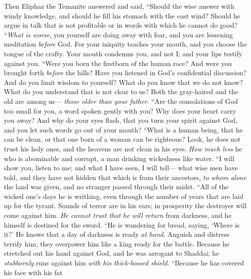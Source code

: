 \begin{biblechapter} %
 Then Eliphaz the Temanite answered and said,
\verse “Should the wise answer with windy knowledge, 
and should he fill his stomach with the east wind?
\verse Should he argue in talk that is not profitable 
or in words with which he cannot do good?
\verse “\textit{What is worse}, you yourself are doing away with fear, 
and you are lessening meditation \textit{before} God.
\verse For your iniquity teaches your mouth, 
and you choose the tongue of the crafty.
\verse Your mouth condemns you, and not I; 
and your lips testify against you.
\verse “Were you born the firstborn of the human race? 
And were you brought forth \textit{before} the hills?
\verse Have you listened in God’s confidential discussion? 
And do you limit wisdom to yourself?
\verse What do you know that we do not know? 
What do you understand that is not clear to us?
\verse Both the gray-haired and the old are among us— 
\textit{those older than your father}.
\verse “Are the consolations of God too small for you, 
a word spoken gently with you?
\verse Why does your heart carry you away? 
And why do your eyes flash,
\verse that you turn your spirit against God, 
and you let such words go out of your mouth?
\verse “What is a human being, that he can be clean, 
or that one born of a woman can be righteous?
\verse Look, he does not trust his holy ones, 
and the heavens are not clean in his eyes.
\verse \textit{How much less} he who is abominable and corrupt, 
a man drinking wickedness like water.
\verse “I will show you, listen to me; 
and what I have seen, I will tell—
\verse what wise men have told, 
and they have not hidden that which is from their ancestors,
\verse \textit{to whom alone} the land was given, 
and no stranger passed through their midst.
\verse “All of the wicked one’s days he is writhing, 
even through the number of years that are laid up for the tyrant.
\verse Sounds of terror are in his ears; 
in prosperity the destroyer will come against him.
\verse \textit{He cannot trust that he will return} from darkness, 
and he himself is destined for the sword.
\verse “He is wandering for bread, saying, ‘Where is it?’ 
He knows that a day of darkness is ready \textit{at hand}.
\verse Anguish and distress terrify him; 
they overpower him like a king ready for the battle.
\verse Because he stretched out his hand against God, 
and he was arrogant to Shaddai;
\verse he \textit{stubbornly} runs against him 
\textit{with his thick-bossed shield}.
\verse “Because he has covered his face with his fat 

\end{biblechapter}

